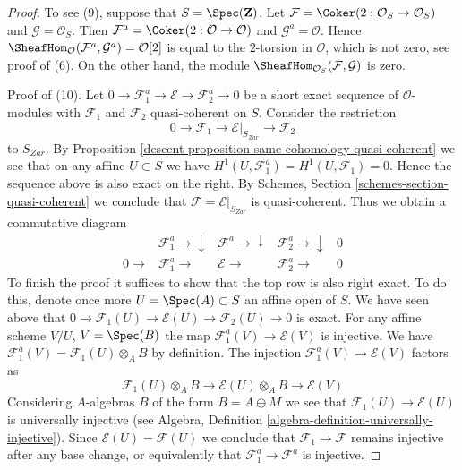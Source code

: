 \begin{proof}
\medskip\noindent
To see (9), suppose that $S = \Spec(\mathbf{Z})$. Let
$\mathcal{F} = \Coker(2 : \mathcal{O}_S \to \mathcal{O}_S)$
and $\mathcal{G} = \mathcal{O}_S$.
Then $\mathcal{F}^a = \Coker(2 : \mathcal{O} \to \mathcal{O})$
and $\mathcal{G}^a = \mathcal{O}$.
Hence
$\SheafHom_\mathcal{O}(\mathcal{F}^a, \mathcal{G}^a) = \mathcal{O}[2]$
is equal to the $2$-torsion in $\mathcal{O}$, which is not zero,
see proof of (6). On the other hand, the module
$\SheafHom_{\mathcal{O}_S}(\mathcal{F}, \mathcal{G})$
is zero.

\medskip\noindent
Proof of (10).
Let $0 \to \mathcal{F}_1^a \to \mathcal{E} \to \mathcal{F}_2^a \to 0$
be a short exact sequence of $\mathcal{O}$-modules with $\mathcal{F}_1$
and $\mathcal{F}_2$ quasi-coherent on $S$. Consider the restriction
$$
0 \to \mathcal{F}_1 \to \mathcal{E}|_{S_{Zar}} \to \mathcal{F}_2
$$
to $S_{Zar}$. By
Proposition \ref{descent-proposition-same-cohomology-quasi-coherent}
we see that on any affine $U \subset S$ we have
$H^1(U, \mathcal{F}_1^a) = H^1(U, \mathcal{F}_1) = 0$.
Hence the sequence above is also exact on the right. By
Schemes, Section \ref{schemes-section-quasi-coherent}
we conclude that $\mathcal{F} = \mathcal{E}|_{S_{Zar}}$ is
quasi-coherent. Thus we obtain a commutative diagram
$$
\begin{array}{ccccc} & \mathcal{F}_1^a \longrightarrow\downarrow & \mathcal{F}^a \longrightarrow\downarrow & \mathcal{F}_2^a \longrightarrow\downarrow & 0 \\ 0 \longrightarrow & \mathcal{F}_1^a \longrightarrow & \mathcal{E} \longrightarrow & \mathcal{F}_2^a \longrightarrow & 0\end{array}
$$
To finish the proof it suffices to show that the top row is also
right exact. To do this, denote once more $U = \Spec(A) \subset S$
an affine open of $S$. We have seen above that
$0 \to \mathcal{F}_1(U) \to \mathcal{E}(U) \to \mathcal{F}_2(U) \to 0$
is exact. For any affine scheme $V/U$,
$V = \Spec(B)$ the map $\mathcal{F}_1^a(V) \to \mathcal{E}(V)$
is injective. We have $\mathcal{F}_1^a(V) = \mathcal{F}_1(U) \otimes_A B$
by definition. The injection
$\mathcal{F}_1^a(V) \to \mathcal{E}(V)$ factors as
$$
\mathcal{F}_1(U) \otimes_A B \to
\mathcal{E}(U) \otimes_A B \to \mathcal{E}(V)
$$
Considering $A$-algebras $B$ of the form $B = A \oplus M$
we see that $\mathcal{F}_1(U) \to \mathcal{E}(U)$ is
universally injective (see
Algebra, Definition \ref{algebra-definition-universally-injective}).
Since $\mathcal{E}(U) = \mathcal{F}(U)$ we conclude that
$\mathcal{F}_1 \to \mathcal{F}$ remains injective after any base change,
or equivalently that $\mathcal{F}_1^a \to \mathcal{F}^a$ is injective.
\end{proof}

